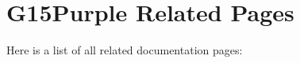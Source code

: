 \section{G15Purple Related Pages}
Here is a list of all related documentation pages:\begin{CompactList}
\item {}

\end{CompactList}
